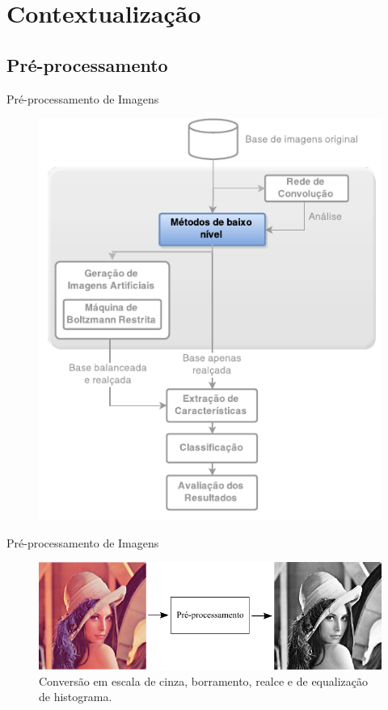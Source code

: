 \documentclass{beamer}
\begin{document}
\section{Contextualização}
\subsection{Pré-processamento}
\begin{frame}{Pré-processamento de Imagens}
\begin{figure}
    \includegraphics[height=0.75\textheight]{figuras/geral_metodos.pdf}
\end{figure}
\end{frame}
\begin{frame}{Pré-processamento de Imagens}
\begin{figure}[htbp]
 \begin{center}
   \includegraphics[width=1\linewidth]{figuras/preprocessamento.png}
 \caption{Conversão em escala de cinza, borramento, realce e de equalização de histograma.}
 \end{center}
\end{figure}
\end{frame}
\end{document}
